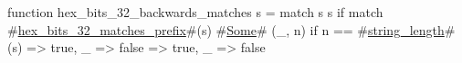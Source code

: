 function hex_bits_32_backwards_matches s = match s {
  s if match #\hyperref[sailRISCVzhexzybitszy32zymatcheszyprefix]{hex\_bits\_32\_matches\_prefix}#(s) {
    #\hyperref[sailRISCVzSome]{Some}# (_, n) if n == #\hyperref[sailRISCVzstringzylength]{string\_length}#(s) => true,
    _ => false
  } => true,
  _ => false
}
